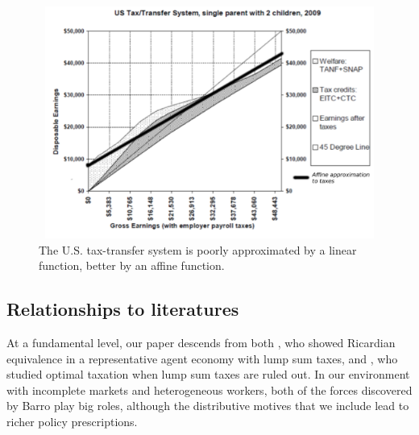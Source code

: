 \documentclass[thmsb,11pt]{article}
\begin{document}
  \begin{figure}[htp]
 \centering
 \includegraphics[width=5in,height=3in]{Draft25Graphs/affine_taxes.pdf}
 \caption{ The U.S. tax-transfer system is poorly approximated by a linear function, better by an affine
function.}
 \label{fig:affine_taxes}
 \end{figure}


\subsection{Relationships to literatures}

At a fundamental level, our paper descends from both \citet{Barro1974}, who showed Ricardian equivalence in a representative agent economy with lump sum taxes, and \citet{Barro1979}, who studied  optimal taxation  when lump sum taxes are ruled out. In our environment with incomplete markets and heterogeneous workers,  both of the forces discovered by Barro play big roles, although the distributive motives that we include lead to  richer policy prescriptions.
\end{document}
